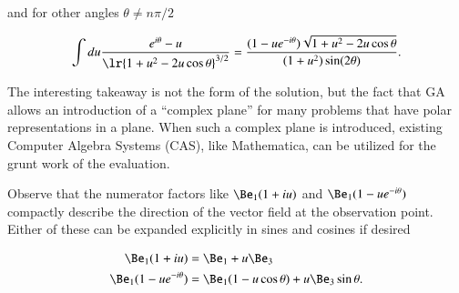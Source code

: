 and for other angles \( \theta \neq n \pi/2 \)

\begin{dmath}\label{eqn:linecharge:100}
\int
du \frac{ e^{i\theta} - u }{ \lr{ 1 + u^2 - 2 u \cos\theta }^{3/2} }
= \frac{(1 -u e^{-i\theta}) \sqrt{1 + u^2 - 2 u \cos\theta}}{(1 + u^2) \sin(2\theta)}.
\end{dmath}

The interesting takeaway is not the form of the solution, but the fact that GA allows an introduction of a ``complex plane'' for many problems that have polar representations in a plane.  When such a complex plane is introduced,
existing Computer Algebra Systems (CAS), like Mathematica, can be utilized for the grunt work of the evaluation.

Observe that the numerator factors like \( \Be_1 (1 + i u) \) and \( \Be_1(1 - u e^{-i\theta}) \)
compactly describe the direction of the vector field at the observation point.  Either of these can be expanded explicitly in sines and cosines if desired

\begin{dmath}\label{eqn:linecharge:140}
\begin{aligned}
\Be_1 (1 + i u) &= \Be_1 + u \Be_3 \\
\Be_1(1 - u e^{-i\theta}) &= \Be_1(1 - u \cos\theta) + u \Be_3 \sin\theta.
\end{aligned}
\end{dmath}


